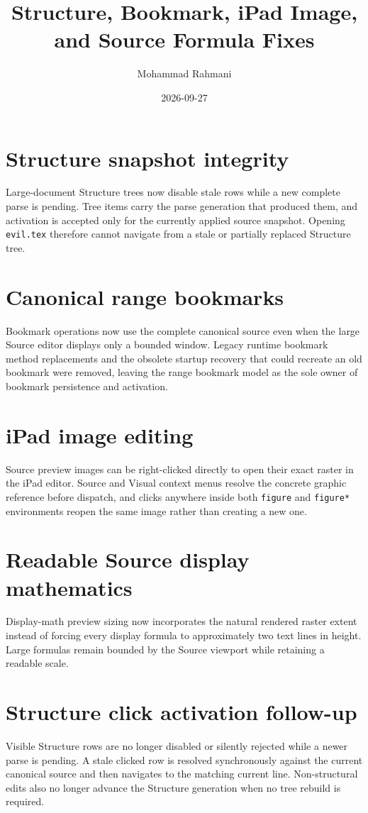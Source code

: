 \documentclass[a4paper]{article}
\title{Structure, Bookmark, iPad Image, and Source Formula Fixes}
\date{2026-09-27}
\author{Mohammad Rahmani}
\begin{document}
   \maketitle

   \begin{preview}
      \section{Structure snapshot integrity}
      Large-document Structure trees now disable stale rows while a new
      complete parse is pending. Tree items carry the parse generation that
      produced them, and activation is accepted only for the currently applied
      source snapshot. Opening \texttt{evil.tex} therefore cannot navigate
      from a stale or partially replaced Structure tree.

      \section{Canonical range bookmarks}
      Bookmark operations now use the complete canonical source even when the
      large Source editor displays only a bounded window. Legacy runtime
      bookmark method replacements and the obsolete startup recovery that
      could recreate an old bookmark were removed, leaving the range bookmark
      model as the sole owner of bookmark persistence and activation.

      \section{iPad image editing}
      Source preview images can be right-clicked directly to open their exact
      raster in the iPad editor. Source and Visual context menus resolve the
      concrete graphic reference before dispatch, and clicks anywhere inside
      both \texttt{figure} and \texttt{figure*} environments reopen the same
      image rather than creating a new one.
      \section{Readable Source display mathematics}
      Display-math preview sizing now incorporates the natural rendered raster
      extent instead of forcing every display formula to approximately two
      text lines in height. Large formulas remain bounded by the Source
      viewport while retaining a readable scale.

      \section{Structure click activation follow-up}
      Visible Structure rows are no longer disabled or silently rejected while
      a newer parse is pending. A stale clicked row is resolved synchronously
      against the current canonical source and then navigates to the matching
      current line. Non-structural edits also no longer advance the Structure
      generation when no tree rebuild is required.


\end{preview}
\end{document}
